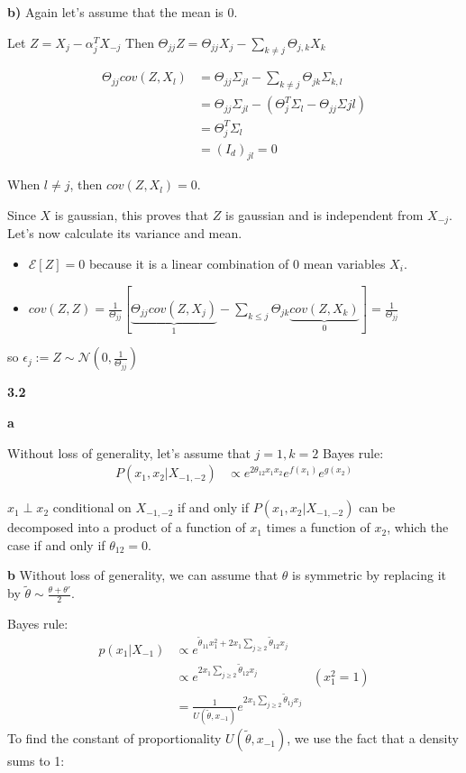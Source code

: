 \documentclass[11pt]{article}
\begin{document}
\textbf{b)}
Again let's assume that the mean is 0.

Let \(Z = X_j - \alpha_j^T X_{-j}\)
Then \(\Theta_{jj}Z = \Theta_{jj}X_j - \sum_{k \ne j} \Theta_{j,k} X_k\)


\begin{align*}
\Theta_{jj} cov(Z, X_l)
&= \Theta_{jj} \Sigma_{jl} - \sum_{k \ne j} \Theta_{jk} \Sigma_{k, l}
\\&= \Theta_{jj} \Sigma_{jl} -  (\Theta_j^T \Sigma_l - \Theta_{jj}\Sigma{jl})
\\&= \Theta_j^T \Sigma_l
\\&= (I_d)_{jl} = 0
\end{align*}


When \(l \ne j\), then \(cov(Z, X_l) = 0\).

Since \(X\) is gaussian, this proves that \(Z\) is gaussian and is independent from \(X_{-j}\).
Let's now calculate its variance and mean.

\begin{itemize}
\item \(\mathcal E[Z] = 0\) because it is a linear combination of 0 mean variables \(X_i\).
\item \(cov(Z, Z) = \frac1{\Theta_{jj}} [\underbrace{\Theta_{jj} cov(Z, X_j)}_1 - \sum_{k \le j} \Theta_{jk} \underbrace{cov(Z, X_k)}_0] = \frac1{\Theta_{jj}}\)
\end{itemize}



so \(\epsilon_j := Z \sim \mathcal N(0, \frac1{\Theta_{jj}})\)

\textbf{3.2}

\textbf{a}

Without loss of generality, let's assume that \(j = 1, k = 2\)
Bayes rule:
\begin{align*}
P(x_1, x_2 | X_{-1, -2})
&\propto e^{2 \theta_{12}x_1x_2}  e^{f(x_1)} e^{g(x_2)}
\end{align*}

\(x_1 \perp x_2\) conditional on \(X_{-1, -2}\) if and only if \(P(x_1, x_2 | X_{-1, -2})\) can be decomposed into a product of a function of \(x_1\) times a function of \(x_2\), which the case if and only if \(\theta_{12} = 0\).

\textbf{b}
Without loss of generality, we can assume that \(\theta\) is symmetric by replacing it by \(\tilde \theta \sim \frac{\theta + \theta'}2\).

Bayes rule:
\begin{align*}
p(x_1 | X_{-1})
&\propto e^{\tilde \theta_{11} x_1^2 + 2 x_1\sum_{j \ge 2} \tilde \theta_{12} x_j} 
\\&\propto e^{2 x_1\sum_{j \ge 2} \tilde \theta_{12} x_j} &(x_1^2 = 1)
\\&= \frac{1}{U(\tilde \theta, x_{-1})} e^{2 x_1\sum_{j \ge 2} \tilde \theta_{1j} x_j} 
\end{align*}
To find the constant of proportionality \(U(\tilde \theta, x_{-1})\), we use the fact that a density sums to 1:
\end{document}
